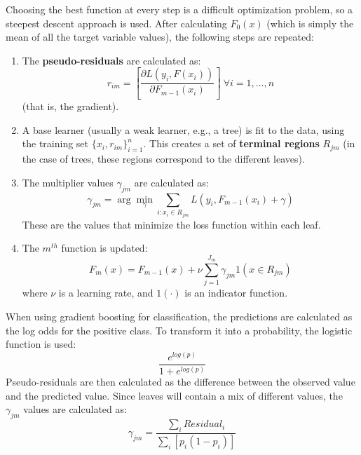 Choosing the best function at every step is a difficult optimization problem, so a steepest descent approach is used. After calculating $F_0(x)$ (which is simply the mean of all the target variable values), the following steps are repeated:
\begin{enumerate}
    \item The \textbf{pseudo-residuals} are calculated as:
    \begin{equation*}
        r_{im} = \left [ \dfrac{\partial L(y_i, F(x_i))}{\partial F_{m-1}(x_i)} \right ] \ \forall i = 1, \dots, n
    \end{equation*}
    (that is, the gradient).

    \item A base learner (usually a weak learner, e.g., a tree) is fit to the data, using the training set $\{x_i, r_{im}\}_{i=1}^n$. This creates a set of \textbf{terminal regions} $R_{jm}$ (in the case of trees, these regions correspond to the different leaves).

    \item The multiplier values $\gamma_{jm}$ are calculated as:
    \begin{equation*}
        \gamma_{jm} = \arg \min_{\gamma} \sum_{i:x_i \in R_{jm}} L(y_i, F_{m-1}(x_i) + \gamma)
    \end{equation*}
    These are the values that minimize the loss function within each leaf.

    \item The $m^{th}$ function is updated:
    \begin{equation*}
        F_m(x) = F_{m-1}(x) + \nu \sum_{j=1}^{J_m} \gamma_{jm} 1(x \in R_{jm}) 
    \end{equation*}
    where $\nu$ is a learning rate, and $1(\cdot)$ is an indicator function.
\end{enumerate}

When using gradient boosting for classification, the predictions are calculated as the log odds for the positive class. To transform it into a probability, the logistic function is used:
\begin{equation*}
    \dfrac{e^{log(p)}}{1+e^{log(p)}}
\end{equation*}
Pseudo-residuals are then calculated as the difference between the observed value and the predicted value. Since leaves will contain a mix of different values, the $\gamma_{jm}$ values are calculated as:
\begin{equation*}
    \gamma_{jm} = \dfrac{\sum_i \textit{Residual}_i}{\sum_i \left [ p_i(1-p_i) \right ]}
 \end{equation*}

